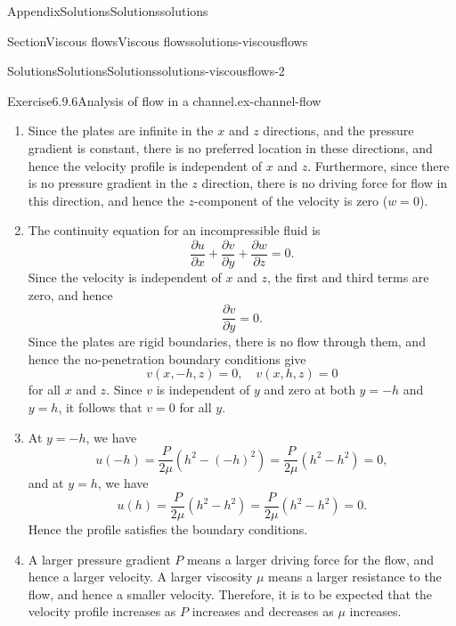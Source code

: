 \documentclass[oneside,10pt,]{book}
\numberwithin{equation}{section}
\newcommand{\pd}[2]{\frac{\partial#1}{\partial#2}}
\newcommand{\bu}{\boldsymbol{u}}
\begin{document}
\begin{appendixptx}{Appendix}{Solutions}{}{Solutions}{}{}{solutions}
\begin{sectionptx}{Section}{Viscous flows}{}{Viscous flows}{}{}{solutions-viscousflows}
\begin{solutions-subsection-numberless}{Solutions}{Solutions}{}{Solutions}{}{}{solutions-viscousflows-2}
\begin{divisionsolution}{Exercise}{6.9.6}{Analysis of flow in a channel.}{ex-channel-flow}
\begin{enumerate}[font=\bfseries,label=(\alph*),ref=\alph*]
\begin{equation*}
\bu(x,-h,z)=0,\quad \bu(x,h,z)=0
\end{equation*}
for all \(x\) and \(z\).%
\item[(b)]\noindent\hypertarget{ex-channel-flow-4-2-main}{}Since the plates are infinite in the \(x\) and \(z\) directions, and the pressure gradient is constant, there is no preferred location in these directions, and hence the velocity profile is independent of \(x\) and \(z\). Furthermore, since there is no pressure gradient in the \(z\) direction, there is no driving force for flow in this direction, and hence the \(z\)-component of the velocity is zero (\(w=0\)).%
\item[(c)]\noindent\hypertarget{ex-channel-flow-5-2-main}{}The continuity equation for an incompressible fluid is%
\begin{equation*}
\pd{u}{x}+\pd{v}{y}+\pd{w}{z}=0.
\end{equation*}
Since the velocity is independent of \(x\) and \(z\), the first and third terms are zero, and hence%
\begin{equation*}
\pd{v}{y}=0.
\end{equation*}
Since the plates are rigid boundaries, there is no flow through them, and hence the no-penetration boundary conditions give%
\begin{equation*}
v(x,-h,z)=0,\quad v(x,h,z)=0
\end{equation*}
for all \(x\) and \(z\). Since \(v\) is independent of \(y\) and zero at both \(y=-h\) and \(y=h\), it follows that \(v=0\) for all \(y\).%
\item[(d)]\noindent\hypertarget{ex-channel-flow-6-2-main}{}At \(y=-h\), we have%
\begin{equation*}
u(-h)=\frac{P}{2\mu}\left(h^2-(-h)^2\right)
=\frac{P}{2\mu}(h^2-h^2)=0,
\end{equation*}
and at \(y=h\), we have%
\begin{equation*}
u(h)=\frac{P}{2\mu}\left(h^2-h^2\right)
=\frac{P}{2\mu}(h^2-h^2)=0.
\end{equation*}
Hence the profile satisfies the boundary conditions.%
\item[(e)]\noindent\hypertarget{ex-channel-flow-7-2-main}{}A larger pressure gradient \(P\) means a larger driving force for the flow, and hence a larger velocity. A larger viscosity \(\mu\) means a larger resistance to the flow, and hence a smaller velocity. Therefore, it is to be expected that the velocity profile increases as \(P\) increases and decreases as \(\mu\) increases.%

\end{enumerate}
\end{divisionsolution}
\end{solutions-subsection-numberless}
\end{sectionptx}
\end{appendixptx}
\end{document}

